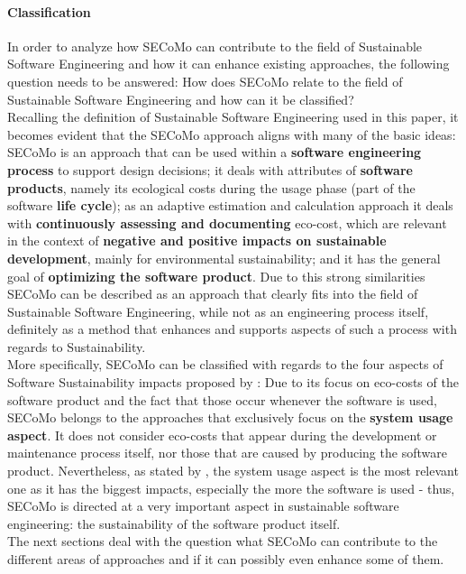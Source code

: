 \documentclass[oribibl]{llncs}
\begin{document}
\paragraph{Classification}
In order to analyze how SECoMo can contribute to the field of Sustainable Software Engineering and how it can enhance existing approaches, the following question needs to be answered: How does SECoMo relate to the field of Sustainable Software Engineering and how can it be classified?\\
Recalling the definition of Sustainable Software Engineering %
used in this paper, it becomes evident that the SECoMo approach aligns with many of the basic ideas: SECoMo is an approach that can be used within a \textbf{software engineering process} to support design decisions; it deals with attributes of \textbf{software products}, namely its ecological costs during the usage phase (part of the software \textbf{life cycle}); as an adaptive estimation and calculation approach it deals with \textbf{continuously assessing and documenting} eco-cost, which are relevant in the context of \textbf{negative and positive impacts on sustainable development}, mainly for environmental sustainability; and it has the general goal of \textbf{optimizing the software product}. Due to this strong similarities SECoMo can be described as an approach that clearly fits into the field of Sustainable Software Engineering, while not as an engineering process itself, definitely as a method that enhances and supports aspects of such a process with regards to Sustainability.\\
More specifically, SECoMo can be classified with regards to the four aspects of Software Sustainability impacts proposed by \cite{penzenstadler_supporting_2012}: Due to its focus on eco-costs of the software product and the fact that those occur whenever the software is used, SECoMo belongs to the approaches that exclusively focus on the \textbf{system usage aspect}. It does not consider eco-costs that appear during the development or maintenance process itself, nor those that are caused by producing the software product. Nevertheless, as stated by \cite{penzenstadler_what_13}, the system usage aspect is the most relevant one as it has the biggest impacts, especially the more the software is used - thus, SECoMo is directed at a very important aspect in sustainable software engineering: the sustainability of the software product itself.\\
The next sections deal with the question what SECoMo can contribute to the different areas of approaches and if it can possibly even enhance some of them.
\end{document}
